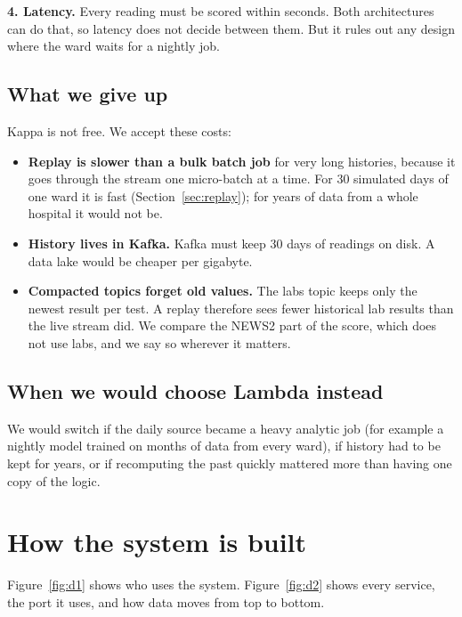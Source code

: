 \documentclass[11pt,a4paper]{article}
\begin{document}
\textbf{4. Latency.} Every reading must be scored within seconds. Both architectures
can do that, so latency does not decide between them. But it rules out any design where
the ward waits for a nightly job.

\subsection{What we give up}

Kappa is not free. We accept these costs:

\begin{itemize}
  \item \textbf{Replay is slower than a bulk batch job} for very long histories,
  because it goes through the stream one micro-batch at a time. For 30 simulated days
  of one ward it is fast (Section~\ref{sec:replay}); for years of data from a whole
  hospital it would not be.
  \item \textbf{History lives in Kafka.} Kafka must keep 30 days of readings on disk.
  A data lake would be cheaper per gigabyte.
  \item \textbf{Compacted topics forget old values.} The labs topic keeps only the
  newest result per test. A replay therefore sees fewer historical lab results than the
  live stream did. We compare the NEWS2 part of the score, which does not use labs, and
  we say so wherever it matters.
\end{itemize}

\subsection{When we would choose Lambda instead}

We would switch if the daily source became a heavy analytic job (for example a
nightly model trained on months of data from every ward), if history had to be kept for
years, or if recomputing the past quickly mattered more than having one copy of the
logic.

\section{How the system is built}

Figure~\ref{fig:d1} shows who uses the system. Figure~\ref{fig:d2} shows every
service, the port it uses, and how data moves from top to bottom.
\end{document}
